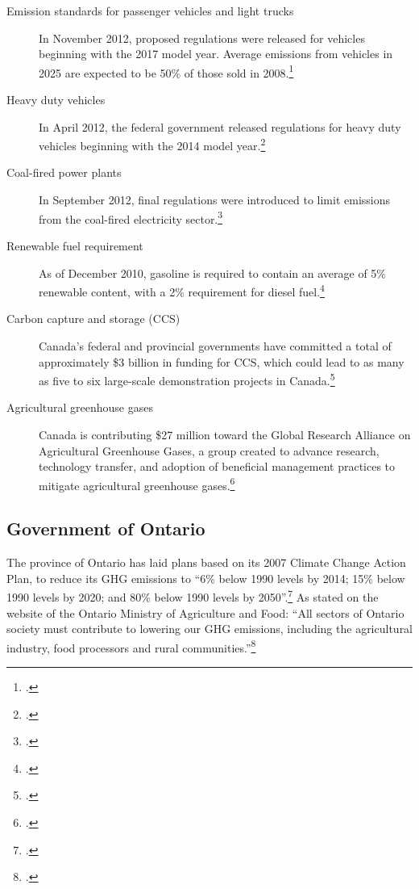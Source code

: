 \begin{description}
	\item[Emission standards for passenger vehicles and light trucks] In November 2012, proposed regulations were released for vehicles beginning with the 2017 model year. 
	Average emissions from vehicles in 2025 are expected to be 50\% of those sold in 2008.\footcite[][]{ECReducing}
	\item[Heavy duty vehicles] In April 2012, the federal government released regulations for heavy duty vehicles beginning with the 2014 model year.\footcite[][]{ECReducing}
	\item[Coal-fired power plants] In September 2012, final regulations were introduced to limit emissions from the coal-fired electricity sector.\footcite[][]{ECCoalFired}
	\item[Renewable fuel requirement] As of December 2010, gasoline is required to contain an average of 5\% renewable content, with a 2\% requirement for diesel fuel.\footcite[][]{ECReducing}
	\item[Carbon capture and storage (CCS)] Canada's federal and provincial governments have committed a total of approximately \$3 billion in funding for CCS, which could lead to as many as five to six large-scale demonstration projects in Canada.\footcite[][]{ECReducing}
	\item[Agricultural greenhouse gases] Canada is contributing \$27 million toward the Global Research Alliance on Agricultural Greenhouse Gases, a group created to advance research, technology transfer, and adoption of beneficial management practices to mitigate agricultural greenhouse gases.\footcite[][]{ECReducing}
\end{description}		
		
		
		
		\subsection{Government of Ontario}



The province of Ontario has laid plans based on its 2007 Climate Change Action Plan, to reduce its GHG emissions to ``6\% below 1990 levels by 2014; 15\% below 1990 levels by 2020; and 80\% below 1990 levels by 2050''.\footcite[][p.3]{20082009ActionPlan}
As stated on the website of the Ontario Ministry of Agriculture and Food: ``All sectors of Ontario society must contribute to lowering our GHG emissions, including the agricultural industry, food processors and rural communities.''\footcite[][]{OntarioCCandAg}

